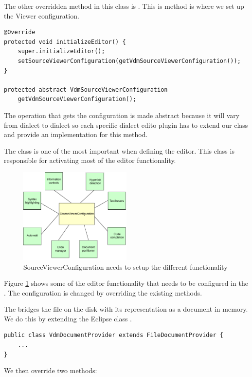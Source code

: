 The other overridden method in this class is . This is method is where we set up the Viewer configuration.
\begin{lstlisting}
@Override
protected void initializeEditor() {		
	super.initializeEditor();
	setSourceViewerConfiguration(getVdmSourceViewerConfiguration());
}

protected abstract VdmSourceViewerConfiguration 
	getVdmSourceViewerConfiguration();
\end{lstlisting}
The operation that gets the  configuration is made abstract because it will vary from dialect to dialect so each specific dialect edito plugin has to extend our  class and provide an implementation for this method.

The  class is one of the most important when defining the editor. This class is responsible for activating most of the editor functionality.
\begin{figure}[htb]
\centering
\includegraphics[width=0.5\textwidth]{figures/sourceviewerconfig}
\caption{SourceViewerConfiguration needs to setup the different functionality}
\label{fig:sourceviewerconfig}
\end{figure}

Figure \ref{fig:sourceviewerconfig} shows some of the editor functionality that needs to be configured in the . The configuration is changed by overriding the existing methods.


The  bridges the file on the disk with its representation as a document in memory. We do this by extending the Eclipse class .

\begin{lstlisting}
public class VdmDocumentProvider extends FileDocumentProvider {
	...
}
\end{lstlisting}
We then override two methods:

